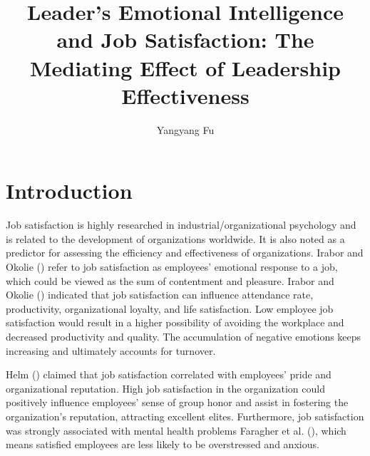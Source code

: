 \documentclass[
  man,
  longtable,
  nolmodern,
  notxfonts,
  notimes,
  colorlinks=true,linkcolor=blue,citecolor=blue,urlcolor=blue]{apa7}
\title{Leader's Emotional Intelligence and Job Satisfaction: The
Mediating Effect of Leadership Effectiveness}
\author{Yangyang Fu}
\affiliation{
{Department of Social Science, University of Chicago}}
\begin{document}
\maketitle


\setcounter{secnumdepth}{-\maxdimen} %

\setlength\LTleft{0pt}


\section{Introduction}\label{introduction}

Job satisfaction is highly researched in industrial/organizational
psychology and is related to the development of organizations worldwide.
It is also noted as a predictor for assessing the efficiency and
effectiveness of organizations. Irabor and Okolie
() refer to job satisfaction as
employees' emotional response to a job, which could be viewed as the sum
of contentment and pleasure. Irabor and Okolie
() indicated that job satisfaction can
influence attendance rate, productivity, organizational loyalty, and
life satisfaction. Low employee job satisfaction would result in a
higher possibility of avoiding the workplace and decreased productivity
and quality. The accumulation of negative emotions keeps increasing and
ultimately accounts for turnover.

Helm () claimed that job satisfaction
correlated with employees' pride and organizational reputation. High job
satisfaction in the organization could positively influence employees'
sense of group honor and assist in fostering the organization's
reputation, attracting excellent elites. Furthermore, job satisfaction
was strongly associated with mental health problems Faragher et al.
(), which means satisfied employees are
less likely to be overstressed and anxious.
\end{document}
